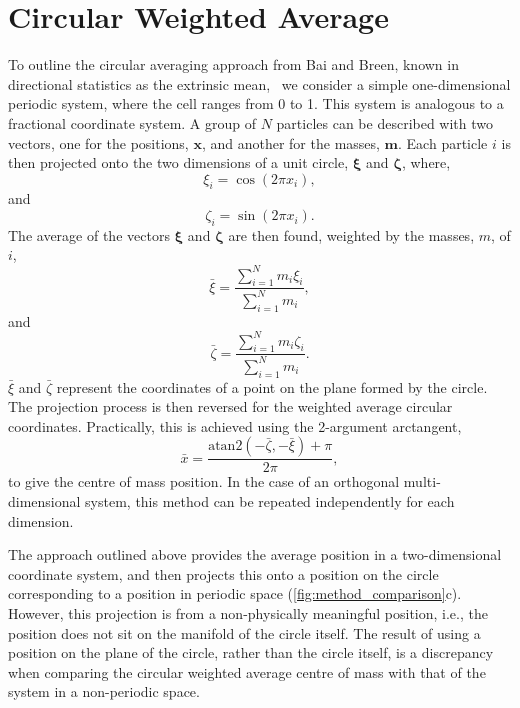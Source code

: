 \documentclass[reprint,superscriptaddress,nobibnotes,amsmath,amssymb,aip]{revtex4-2}
\begin{document}
\section{Circular Weighted Average}

To outline the circular averaging approach from Bai and Breen, known in directional statistics as the extrinsic mean,~\cite{hotz_intrinsic_2011} we consider a simple one-dimensional periodic system, where the cell ranges from \num{0} to \num{1}. 
This system is analogous to a fractional coordinate system. 
A group of $N$ particles can be described with two vectors, one for the positions, $\bm{x}$, and another for the masses, $\bm{m}$. 
Each particle $i$ is then projected onto the two dimensions of a unit circle, $\bm{\xi}$ and $\bm{\zeta}$, where, 
%
\begin{equation}
    \xi_i = \cos(2\pi x_i),
\end{equation}
%
and 
%
\begin{equation}
    \zeta_i = \sin(2\pi x_i).
\end{equation}
The average of the vectors $\bm{\xi}$ and $\bm{\zeta}$ are then found, weighted by the masses, $m$, of $i$,
%
\begin{equation}
    \bar{\xi} = \frac{\sum_{i=1}^{N}m_i\xi_i}{\sum_{i=1}^{N}m_i},
\end{equation}
% 
and
%
\begin{equation}
    \bar{\zeta} = \frac{\sum_{i=1}^{N}m_i\zeta_i}{\sum_{i=1}^{N}m_i}.
\end{equation}
% 
$\bar{\xi}$ and $\bar{\zeta}$ represent the coordinates of a point on the plane formed by the circle. 
The projection process is then reversed for the weighted average circular coordinates.
Practically, this is achieved using the 2-argument arctangent, 
%
\begin{equation}
    \bar{x} = \frac{\text{atan}2(-\bar{\zeta}, -\bar{\xi}) + \pi}{2\pi},
\end{equation}
%
to give the centre of mass position.
In the case of an orthogonal multi-dimensional system, this method can be repeated independently for each dimension. 

The approach outlined above provides the average position in a two-dimensional coordinate system, and then projects this onto a position on the circle corresponding to a position in periodic space (\cref{fig:method_comparison}c). 
However, this projection is from a non-physically meaningful position, i.e., the position does not sit on the manifold of the circle itself.
The result of using a position on the plane of the circle, rather than the circle itself, is a discrepancy when comparing the circular weighted average centre of mass with that of the system in a non-periodic space. 
\end{document}
